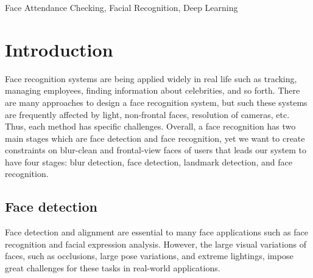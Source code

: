 \documentclass[journal, twocolumn]{IEEEtran}
\begin{document}
\begin{IEEEkeywords}
Face Attendance Checking, Facial Recognition, Deep Learning
\end{IEEEkeywords}


\IEEEpeerreviewmaketitle


\section{Introduction}
\label{introduction}

Face recognition systems are being applied widely in real life such as tracking, managing employees, finding information about celebrities, and so forth. There are many approaches to design a face recognition system, but such these systems are frequently affected by light, non-frontal faces, resolution of cameras, etc. Thus, each method has specific challenges. Overall, a face recognition has two main stages which are face detection and face recognition, yet we want to create constraints on blur-clean and frontal-view faces of users that leads our system to have four stages: blur detection, face detection, landmark detection, and face recognition.  


\subsection{Face detection}
Face detection and alignment are essential to many face applications such as face recognition and facial expression analysis. However, the large visual variations of faces, such as occlusions, large pose variations, and extreme lightings, impose great challenges for these tasks in real-world applications.
\end{document}
